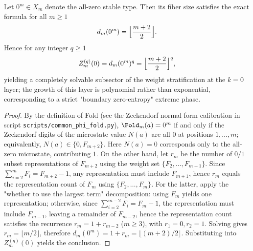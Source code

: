 \begin{conclusion}[Closed form for the zero-weight fiber: \texorpdfstring{$d_m(0^m)=\lfloor (m+2)/2\rfloor$}{d_m(0^m)=floor((m+2)/2)}]\label{con:xi-terminal-zero-weight-fiber-closed}
Let \(0^m\in X_m\) denote the all-zero stable type.
Then its fiber size satisfies the exact formula for all \(m\ge 1\)
\[
d_m(0^m)=\Bigl\lfloor\frac{m+2}{2}\Bigr\rfloor.
\]
Hence for any integer \(q\ge 1\)
\[
Z_m^{(q)}(0)=d_m(0^m)^q=\Bigl\lfloor\frac{m+2}{2}\Bigr\rfloor^q,
\]
yielding a completely solvable subsector of the weight stratification at the \(k=0\) layer; the growth of this layer is polynomial rather than exponential, corresponding to a strict "boundary zero-entropy" extreme phase.
\end{conclusion}
\begin{proof}
By the definition of Fold (see the Zeckendorf normal form calibration in script \texttt{scripts/common\_phi\_fold.py}),
\(\Fold_m(a)=0^m\) if and only if the Zeckendorf digits of the microstate value \(N(a)\) are all \(0\) at positions \(1,\dots,m\);
equivalently, \(N(a)\in\{0,F_{m+2}\}\).
Here \(N(a)=0\) corresponds only to the all-zero microstate, contributing \(1\).
On the other hand, let \(r_m\) be the number of \(0/1\) subset representations of \(F_{m+2}\) using the weight set \(\{F_2,\dots,F_{m+1}\}\).
Since \(\sum_{i=2}^{m}F_i=F_{m+2}-1\), any representation must include \(F_{m+1}\), hence \(r_m\) equals the representation count of \(F_m\) using \(\{F_2,\dots,F_m\}\).
For the latter, apply the "whether to use the largest term" decomposition: using \(F_m\) yields one representation; otherwise, since \(\sum_{i=2}^{m-2}F_i=F_m-1\), the representation must include \(F_{m-1}\), leaving a remainder of \(F_{m-2}\), hence the representation count satisfies the recurrence \(r_m=1+r_{m-2}\) (\(m\ge 3\)), with \(r_1=0,r_2=1\).
Solving gives \(r_m=\lfloor m/2\rfloor\), therefore
\(
d_m(0^m)=1+r_m=\lfloor (m+2)/2\rfloor
\).
Substituting into \(Z_m^{(q)}(0)\) yields the conclusion.
\end{proof}

